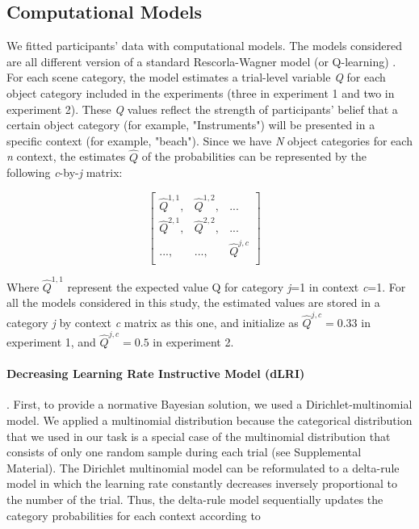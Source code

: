 \documentclass[a4paper,12pt]{article} 			%
\begin{document}
\subsection{Computational Models}
We fitted participants' data with computational models. The models considered are all different version of a standard Rescorla-Wagner model (or Q-learning) \citep{Sutton1998, Daw2011}. For each scene category, the model estimates a trial-level variable \textit{Q} for each object category included in the experiments (three in experiment 1 and two in experiment 2). These \textit{Q} values reflect the strength of participants' belief that a certain object category (for example, "Instruments") will be presented in a specific context (for example, "beach"). 
\noindent
Since we have \textit{N} object categories for each \textit{n} context, the estimates $\hat{Q}$ of the probabilities can be represented by the following \textit{c}-by-\textit{j} matrix:

\begin{equation}
\begin{bmatrix} 
\hat{Q}^{1,1}, & \hat{Q}^{1,2}, & ... \\
\hat{Q}^{2,1}, & \hat{Q}^{2,2}, & ...\\
..., &..., & \hat{Q}^{j,c} \\
\end{bmatrix}
\quad
\label{matrix}
\end{equation}

\noindent
Where $\hat{Q}^{1,1}$ represent the expected value Q for category \textit{j}=1 in context \textit{c}=1. For all the models considered in this study, the estimated values are stored in a category \textit{j} by context \textit{c} matrix as this one, and initialize as  $\hat{Q}^{j,c} = 0.33$ in experiment 1, and $\hat{Q}^{j,c} = 0.5$ in experiment 2.

\paragraph{Decreasing Learning Rate Instructive Model (dLRI)}. First, to provide a normative Bayesian solution, we used a Dirichlet-multinomial model. We applied a multinomial distribution because the categorical distribution that we used in our task is a special case of the multinomial distribution that consists of only one random sample during each trial (see Supplemental Material). The Dirichlet multinomial model can be reformulated to a delta-rule model in which the learning rate constantly decreases inversely proportional to the number of the trial. 
Thus, the delta-rule model sequentially updates the category probabilities for each context according to
\end{document}
